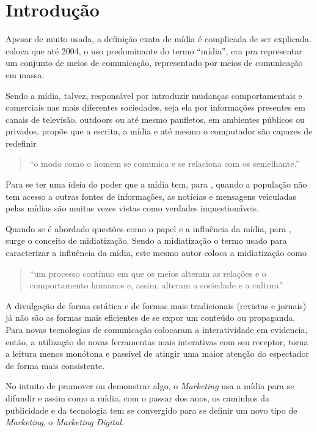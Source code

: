 \chapter[Introdução]{Introdução}
Apesar de muito usada, a definição exata de mídia é complicada de ser explicada. \cite[p.49]{guazina2007} coloca que até 2004, o uso predominante do termo ``mídia'', era pra representar um conjunto de meios de comunicação, representado por meios de comunicação em massa.

Sendo a mídia, talvez, responsável por introduzir mudanças comportamentais e comerciais nas mais diferentes sociedades, seja ela por informações presentes em canais de televisão, outdoors ou até mesmo panfletos, em ambientes públicos ou privados, \cite[p.3]{escobar2007} propõe que a escrita, a mídia e até mesmo o computador são capazes de redefinir \begin{quote}``o modo como o homem se comunica e se relaciona com os semelhante.''  \end{quote}

Para se ter uma ideia do poder que a mídia tem, para \cite{silva2007}, quando a população não tem acesso a outras fontes de informações, as notícias e mensagens veiculadas pelas mídias são muitas vezes vistas como verdades inquestionáveis. 

Quando se é abordado questões como o papel e a influência da mídia, para \cite[p.54]{hjarvard2012}, surge o conceito de midiatização. Sendo a midiatização o termo usado para caracterizar a influência da mídia, este mesmo autor coloca a midiatização como \begin{quote}``um processo contínuo em que os meios alteram as relações e o comportamento humanos e, assim, alteram a sociedade e a cultura''.\end{quote} 

A divulgação de forma estática e de formas mais tradicionais (revistas e jornais) já não são as formas mais eficientes de se expor um conteúdo ou propaganda. Para \cite[p.2]{escobar2007} novas tecnologias de comunicação colocaram a interatividade em evidencia, então, a utilização de novas ferramentas mais interativas com seu receptor, torna a leitura menos monótona e passível de atingir uma maior atenção do espectador de forma mais consistente.

No intuito de promover ou demonstrar algo, o \textit{Marketing} usa a mídia para se difundir e assim como a mídia, com o passar dos anos, os caminhos da publicidade e da tecnologia tem se convergido para se definir um novo tipo de \textit{Marketing}, o \textit{Marketing Digital}.

